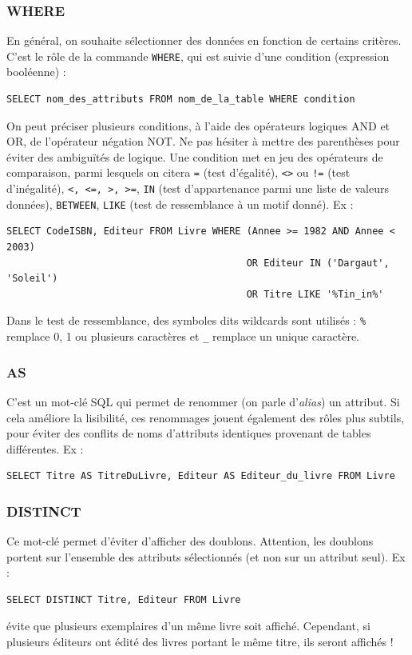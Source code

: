 \documentclass[11pt,a4paper,french,twoside]{PMCours}
\begin{document}
\subsubsection*{WHERE}

En général, on souhaite sélectionner des données en fonction de certains critères. C'est le rôle de la commande \verb'WHERE', qui est suivie d'une condition (expression booléenne) : 
\begin{verbatim}
SELECT nom_des_attributs FROM nom_de_la_table WHERE condition
\end{verbatim}
On peut préciser plusieurs conditions, à l'aide des opérateurs logiques AND et OR, de l'opérateur négation NOT. Ne pas hésiter à mettre des parenthèses pour éviter des ambiguïtés de logique. Une condition met en jeu des opérateurs de comparaison, parmi lesquels on citera \verb'=' (test d'égalité), \verb'<>' ou \verb'!=' (test d'inégalité), \verb'<, <=, >, >=', \verb'IN' (test d'appartenance parmi une liste de valeurs données), \verb'BETWEEN', \verb'LIKE' (test de ressemblance à un motif donné). Ex : 
\begin{verbatim}
SELECT CodeISBN, Editeur FROM Livre WHERE (Annee >= 1982 AND Annee < 2003) 
                                          OR Editeur IN ('Dargaut', 'Soleil') 
                                          OR Titre LIKE '%Tin_in%'
\end{verbatim}
Dans le test de ressemblance, des symboles dits wildcards sont utilisés : \verb'%' remplace 0, 1 ou plusieurs caractères et \verb'_' remplace un unique caractère.


\subsubsection*{AS}

C'est un mot-clé SQL qui permet de renommer (on parle d'\emph{alias}) un attribut. Si cela améliore la lisibilité, ces renommages jouent également des rôles plus subtils, pour éviter des conflits de noms d'attributs identiques provenant de tables différentes. Ex :
\begin{verbatim}
SELECT Titre AS TitreDuLivre, Editeur AS Editeur_du_livre FROM Livre
\end{verbatim}


\subsubsection*{DISTINCT}

Ce mot-clé permet d'éviter d'afficher des doublons. Attention, les doublons portent sur l'ensemble des attributs sélectionnés (et non sur un attribut seul). Ex : 
\begin{verbatim}
SELECT DISTINCT Titre, Editeur FROM Livre
\end{verbatim}
évite que plusieurs exemplaires d'un même livre soit affiché. Cependant, si plusieurs éditeurs ont édité des livres portant le même titre, ils seront affichés !
\end{document}
